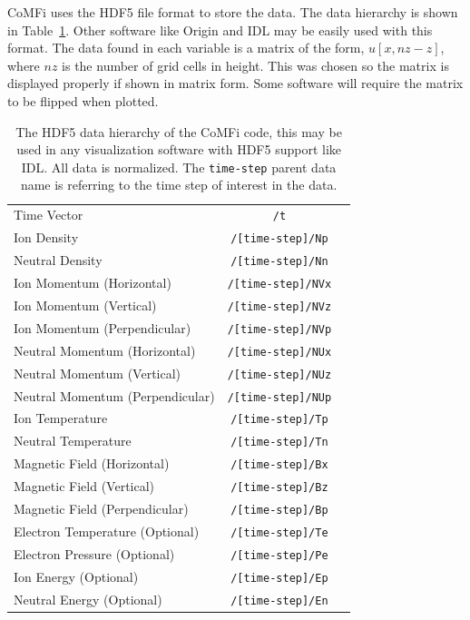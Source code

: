 \documentclass[12pt,upcase]{umlthesis}
\def\code#1{\texttt{#1}}
\begin{document}
CoMFi uses the HDF5 file format to store the data. The data hierarchy is shown in Table~\ref{tab:datahierarchy}. Other software like Origin and IDL may be easily used with this format. The data found in each variable is a matrix of the form, $u[x, {nz}-z]$, where ${nz}$ is the number of grid cells in height. This was chosen so the matrix is displayed properly if shown in matrix form. Some software will require the matrix to be flipped when plotted.

\begin{table}[h]\label{tab:datahierarchy}
\centering
\caption[CoMFi.hdf5 data hierarchy]{The HDF5 data hierarchy of the CoMFi code, this may be used in any visualization software with HDF5 support like IDL\@. All data is normalized. The \code{time-step} parent data name is referring to the time step of interest in the data.}
\begin{tabular}[]{l  c  r}
	\toprule
	Time Vector & \code{/t} \\
	Ion Density & \code{/[time-step]/Np} \\
	Neutral Density & \code{/[time-step]/Nn} \\
	Ion Momentum (Horizontal) & \code{/[time-step]/NVx} \\
	Ion Momentum (Vertical) & \code{/[time-step]/NVz} \\
	Ion Momentum (Perpendicular) & \code{/[time-step]/NVp} \\
	Neutral Momentum (Horizontal) & \code{/[time-step]/NUx} \\
	Neutral Momentum (Vertical) & \code{/[time-step]/NUz} \\
	Neutral Momentum (Perpendicular) & \code{/[time-step]/NUp} \\
	Ion Temperature & \code{/[time-step]/Tp} \\
	Neutral Temperature & \code{/[time-step]/Tn} \\
	Magnetic Field (Horizontal) & \code{/[time-step]/Bx} \\
	Magnetic Field (Vertical) & \code{/[time-step]/Bz} \\
	Magnetic Field (Perpendicular) & \code{/[time-step]/Bp} \\
	Electron Temperature (Optional) & \code{/[time-step]/Te} \\
	Electron Pressure (Optional) & \code{/[time-step]/Pe} \\
	Ion Energy (Optional) & \code{/[time-step]/Ep} \\
	Neutral Energy (Optional) & \code{/[time-step]/En} \\
	\bottomrule
\end{tabular}
\end{table}
\end{document}
